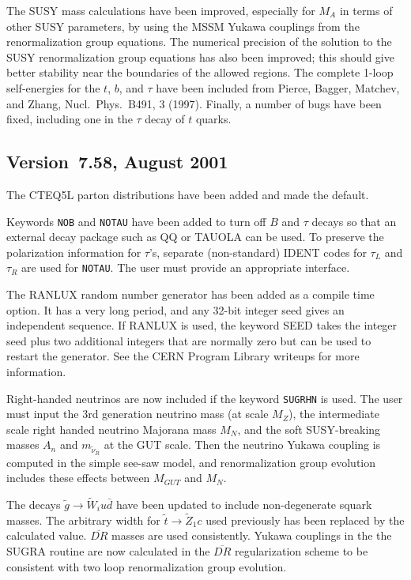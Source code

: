      The SUSY mass calculations have been improved, especially for $M_A$
in terms of other SUSY parameters, by using the MSSM Yukawa couplings
from the renormalization group equations. The numerical precision of the
solution to the SUSY renormalization group equations has also been
improved; this should give better stability near the boundaries of the
allowed regions. The complete 1-loop self-energies for the $t$, $b$, and
$\tau$ have been included from Pierce, Bagger, Matchev, and Zhang,
Nucl.\ Phys.\ B491, 3 (1997). Finally, a number of bugs have been fixed,
including one in the $\tau$ decay of $t$ quarks.

\subsection{Version~7.58, August 2001}

     The CTEQ5L parton distributions have been added and made the
default. 

     Keywords \verb|NOB| and \verb|NOTAU| have been added to turn off
$B$ and $\tau$ decays so that an external decay package such as QQ or
TAUOLA can be used. To preserve the polarization information for
$\tau$'s, separate (non-standard) IDENT codes for $\tau_L$ and $\tau_R$
are used for \verb|NOTAU|. The user must provide an appropriate
interface.

     The RANLUX random number generator has been added as a compile time
option. It has a very long period, and any 32-bit integer seed gives an
independent sequence. If RANLUX is used, the keyword SEED takes the
integer seed plus two additional integers that are normally zero but can
be used to restart the generator. See the CERN Program Library writeups
for more information.

     Right-handed neutrinos are now included if the keyword
\verb|SUGRHN| is used. The user must input the 3rd generation neutrino
mass (at scale $M_Z$), the intermediate scale right handed neutrino
Majorana mass $M_N$, and the soft SUSY-breaking masses $A_n$ and
$m_{\tilde\nu_R}$ at the GUT scale. Then the neutrino Yukawa coupling is
computed in the simple see-saw model, and renormalization group
evolution includes these effects between $M_{GUT}$ and $M_N$.

     The decays $\tilde g \to \tilde W_i u \bar d$ have been updated to
include non-degenerate squark masses. The arbitrary width for $\tilde t
\to \tilde Z_1 c$ used previously has been replaced by the calculated
value. $\overline{DR}$ masses are used consistently. Yukawa couplings in
the the SUGRA routine are now calculated in the $\overline{DR}$
regularization scheme to be consistent with two loop renormalization
group evolution.

